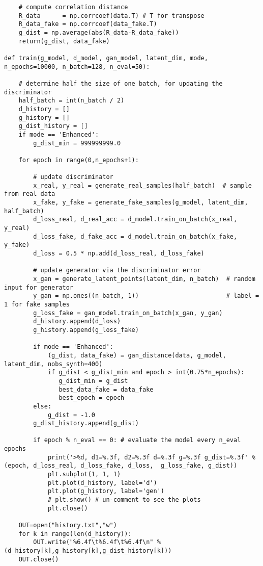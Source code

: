 \documentclass[oneside,10pt]{book}
\begin{document}
\begin{lstlisting}
    # compute correlation distance
    R_data      = np.corrcoef(data.T) # T for transpose
    R_data_fake = np.corrcoef(data_fake.T)
    g_dist = np.average(abs(R_data-R_data_fake))
    return(g_dist, data_fake) 

def train(g_model, d_model, gan_model, latent_dim, mode, n_epochs=10000, n_batch=128, n_eval=50):   
    
    # determine half the size of one batch, for updating the  discriminator
    half_batch = int(n_batch / 2)
    d_history = [] 
    g_history = [] 
    g_dist_history = []
    if mode == 'Enhanced':
        g_dist_min = 999999999.0  

    for epoch in range(0,n_epochs+1): 
                 
        # update discriminator
        x_real, y_real = generate_real_samples(half_batch)  # sample from real data
        x_fake, y_fake = generate_fake_samples(g_model, latent_dim, half_batch)
        d_loss_real, d_real_acc = d_model.train_on_batch(x_real, y_real) 
        d_loss_fake, d_fake_acc = d_model.train_on_batch(x_fake, y_fake)
        d_loss = 0.5 * np.add(d_loss_real, d_loss_fake)

        # update generator via the discriminator error
        x_gan = generate_latent_points(latent_dim, n_batch)  # random input for generator
        y_gan = np.ones((n_batch, 1))                        # label = 1 for fake samples
        g_loss_fake = gan_model.train_on_batch(x_gan, y_gan) 
        d_history.append(d_loss)
        g_history.append(g_loss_fake)

        if mode == 'Enhanced': 
            (g_dist, data_fake) = gan_distance(data, g_model, latent_dim, nobs_synth=400)
            if g_dist < g_dist_min and epoch > int(0.75*n_epochs): 
               g_dist_min = g_dist
               best_data_fake = data_fake
               best_epoch = epoch
        else: 
            g_dist = -1.0
        g_dist_history.append(g_dist)
                
        if epoch % n_eval == 0: # evaluate the model every n_eval epochs
            print('>%d, d1=%.3f, d2=%.3f d=%.3f g=%.3f g_dist=%.3f' % (epoch, d_loss_real, d_loss_fake, d_loss,  g_loss_fake, g_dist))       
            plt.subplot(1, 1, 1)
            plt.plot(d_history, label='d')
            plt.plot(g_history, label='gen')
            # plt.show() # un-comment to see the plots
            plt.close()
       
    OUT=open("history.txt","w")
    for k in range(len(d_history)):
        OUT.write("%6.4f\t%6.4f\t%6.4f\n" %(d_history[k],g_history[k],g_dist_history[k]))
    OUT.close()
    

\end{lstlisting}
\end{document}
